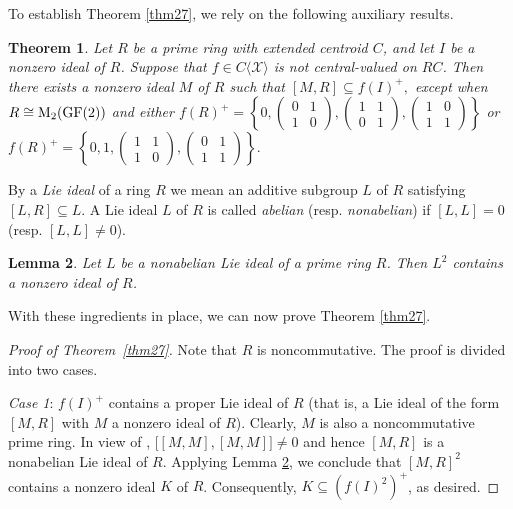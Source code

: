 \documentclass[11pt]{article}
\newtheorem{theorem}{Theorem}
\newtheorem{lemma}[theorem]{Lemma}
\theoremstyle{definition}
\begin{document}
{{{{				To establish Theorem \ref{thm27}, we rely on the following auxiliary results.
				
				\begin{theorem}\label{thm4} {\rm\cite[Theorem 2]{Pa_Cha_01}}
					Let $R$ be a prime ring with extended centroid $C$, and let $I$ be a nonzero ideal of $R$. Suppose that $f\in C\langle \mathcal{X}\rangle$ is not central-valued on $RC$. Then there exists a nonzero ideal $M$ of $R$ such that
					$[M,R]\subseteq f(I)^+,$
					except when $R\cong {\rm M}_2({\rm GF}(2))$ and either
					$
					f(R)^+=\left\{0, \begin{pmatrix}
						0 & 1 \\
						1 & 0
					\end{pmatrix}, \begin{pmatrix}
						1& 1 \\
						0 & 1
					\end{pmatrix},  \begin{pmatrix}
						1& 0 \\
						1 & 1
					\end{pmatrix}\right\}$
or $f(R)^+=\left\{0, 1, \begin{pmatrix}
						1 & 1 \\
						1 & 0
					\end{pmatrix}, \begin{pmatrix}
						0 & 1 \\
						1 & 1
					\end{pmatrix}\right\}.
					$
				\end{theorem}
				
				By a \textit{Lie ideal}  of a ring $R$ we mean an additive subgroup $L$ of $R$ satisfying $[L, R]\subseteq L$. A Lie ideal $L$ of $R$ is called \textit{abelian} (resp. \textit{nonabelian})
				if $[L, L]=0$ (resp. $[L, L]\ne 0$).
				
				\begin{lemma}\label{lem1} {\rm\cite[Theorem 3.5]{Pa_Lee_25}}
					Let $L$ be a nonabelian Lie ideal of a prime ring $R$. Then $L^2$ contains a nonzero ideal of $R$.
				\end{lemma}
				
				With these ingredients in place, we can now prove Theorem \ref{thm27}.
				
				\begin{proof}[Proof of Theorem~\ref{thm27}]
					Note that $R$ is noncommutative. The proof is divided into two cases.
					
					\textit{Case 1}: $f(I)^+$ contains a proper Lie ideal of $R$ (that is, a Lie ideal of the form $[M,R]$ with $M$ a nonzero ideal of $R$).
Clearly, $M$ is also a noncommutative prime ring.
					In view of \cite[Lemma~1.5]{Bo_Her_69}, $\big[[M, M], [M, M]\big]\ne 0$ and hence $[M,R]$ is a nonabelian Lie ideal of $R$. Applying Lemma \ref{lem1}, we conclude that $[M,R]^2$ contains a nonzero ideal $K$ of $R$. Consequently,
					$K\subseteq (f(I)^2)^+$, as desired.
					

\end{proof}}}}}
\end{document}
